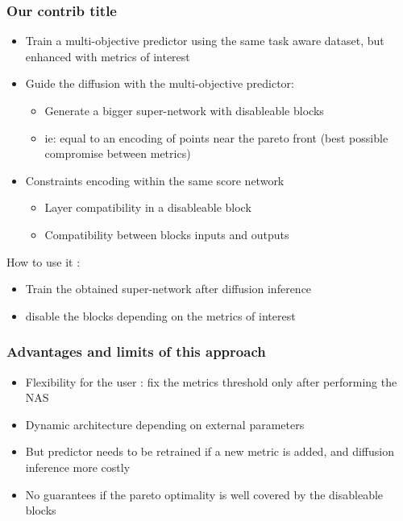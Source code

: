 \documentclass[aspectratio=169,xcolor=dvipsnames]{beamer}
\begin{document}
\begin{frame}
    \frametitle{Our contrib title}
    \begin{itemize}
        \item Train a multi-objective predictor using the same task aware dataset, but enhanced with metrics of interest
        \item Guide the diffusion with the multi-objective predictor:
            \begin{itemize}
                \item Generate a bigger super-network with disableable blocks
                \item ie: equal to an encoding of points near the pareto front (best possible compromise between metrics)
            \end{itemize}
       \item Constraints encoding within the same score network
       \begin{itemize}
        \item Layer compatibility in a disableable block
        \item Compatibility between blocks inputs and outputs
       \end{itemize}
    \end{itemize}
    How to use it :
    \begin{itemize}
        \item Train the obtained super-network after diffusion inference
        \item disable the blocks depending on the metrics of interest
    \end{itemize}
\end{frame}

\begin{frame}
    \frametitle{Advantages and limits of this approach}
    \begin{itemize}
        \item Flexibility for the user : fix the metrics threshold only after performing the NAS
        \item Dynamic architecture depending on external parameters
        \item But predictor needs to be retrained if a new metric is added, and diffusion inference more costly
        \item No guarantees if the pareto optimality is well covered by the disableable blocks
    \end{itemize}
\end{frame}
\end{document}
